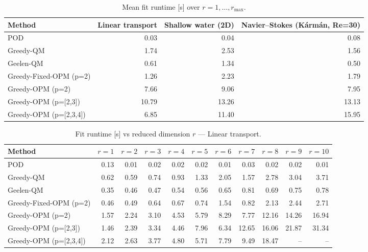 \begin{table}[t]
\centering
\caption{Mean fit runtime [s] over $r=1,\dots,r_{\max}$.}
\label{tab:runtime-summary}
\small
\begin{tabular}{lrrr}
\toprule
\textbf{Method} & Linear transport & Shallow water (2D) & Navier--Stokes (K\'arm\'an, Re=30) \\
\midrule
POD & 0.03 & 0.04 & 0.08 \\
Greedy-QM & 1.74 & 2.53 & 1.56 \\
Geelen-QM & 0.61 & 1.34 & 0.50 \\
Greedy-Fixed-OPM (p=2) & 1.26 & 2.23 & 1.79 \\
Greedy-OPM (p=2) & 7.66 & 9.06 & 7.95 \\
Greedy-OPM (p=[2,3]) & 10.79 & 13.26 & 13.13 \\
Greedy-OPM (p=[2,3,4]) & 6.85 & 11.40 & 15.95 \\
\bottomrule
\end{tabular}
\end{table}

\begin{table}[t]
\centering
\caption{Fit runtime [s] vs reduced dimension $r$ --- Linear transport.}
\label{tab:runtime-transport}
\small
\begin{tabular}{lrrrrrrrrrr}
\toprule
\textbf{Method} & $r=1$ & $r=2$ & $r=3$ & $r=4$ & $r=5$ & $r=6$ & $r=7$ & $r=8$ & $r=9$ & $r=10$ \\
\midrule
POD & 0.13 & 0.01 & 0.02 & 0.02 & 0.02 & 0.01 & 0.03 & 0.02 & 0.02 & 0.01 \\
Greedy-QM & 0.62 & 0.59 & 0.74 & 0.93 & 1.33 & 2.05 & 1.57 & 2.78 & 3.04 & 3.71 \\
Geelen-QM & 0.35 & 0.46 & 0.47 & 0.54 & 0.56 & 0.65 & 0.81 & 0.69 & 0.75 & 0.78 \\
Greedy-Fixed-OPM (p=2) & 0.46 & 0.49 & 0.64 & 0.67 & 0.74 & 1.54 & 0.82 & 2.13 & 2.44 & 2.71 \\
Greedy-OPM (p=2) & 1.57 & 2.24 & 3.10 & 4.53 & 5.79 & 8.29 & 7.77 & 12.16 & 14.26 & 16.94 \\
Greedy-OPM (p=[2,3]) & 1.46 & 2.39 & 3.34 & 4.46 & 7.96 & 6.34 & 12.65 & 16.06 & 21.87 & 31.34 \\
Greedy-OPM (p=[2,3,4]) & 2.12 & 2.63 & 3.77 & 4.80 & 5.71 & 7.79 & 9.49 & 18.47 & -- & -- \\
\bottomrule
\end{tabular}
\end{table}

